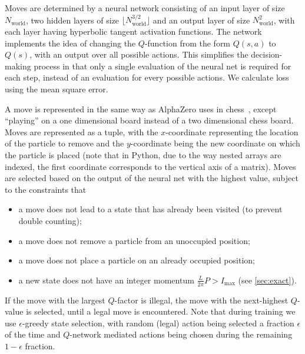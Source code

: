\documentclass[11pt, a4paper]{report} %
\begin{document}
Moves are determined by a neural network consisting of an input layer of size \(N_{\textrm{world}}\), two hidden layers of size \(\lfloor N_{\textrm{world}}^{3/2}\rfloor\) and an output layer of size \(N_{\textrm{world}}^2\), with each layer having hyperbolic tangent activation functions.
The network implements the idea of changing the \(Q\)-function from the form \(Q(s,a)\) to \(Q(s)\), with an output over all possible actions\cite{mnih15_human_level_contr_throug_deep_reinf_learn,mnih13_playin_atari_with_deep_reinf_learn}.
This simplifies the decision-making process in that only a single evaluation of the neural net is required for each step, instead of an evaluation for every possible actions.
We calculate loss using the mean square error.

A move is represented in the same way as AlphaZero uses in chess~\cite{Silver2017}, except ``playing'' on a one dimensional board instead of a two dimensional chess board.
Moves are represented as a tuple, with the \(x\)-coordinate representing the location of the particle to remove and the \(y\)-coordinate being the new coordinate on which the particle is placed (note that in Python, due to the way nested arrays are indexed, the first coordinate corresponds to the vertical axis of a matrix).
Moves are selected based on the output of the neural net with the highest value, subject to the constraints that
\begin{itemize}
\item a move does not lead to a state that has already been visited (to prevent double counting);
\item a move does not remove a particle from an unoccupied position;
\item a move does not place a particle on an already occupied position;
\item a new state does not have an integer momentum \(\frac{L}{2\pi}P > I_{\max}\) (see \cref{sec:exact}).
\end{itemize}
If the move with the largest \(Q\)-factor is illegal, the move with the next-highest \(Q\)-value is selected, until a legal move is encountered.
Note that during training we use \(\epsilon\)-greedy state selection, with random (legal) action being selected a fraction \(\epsilon\) of the time and \(Q\)-network mediated actions being chosen during the remaining \(1-\epsilon\) fraction.
\end{document}
